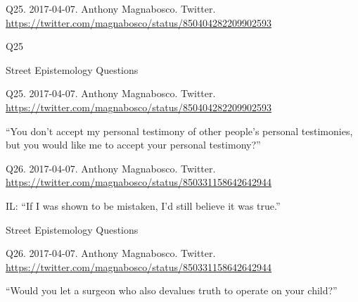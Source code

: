 \documentclass[
    src/templates/5x2-on-a4paper,
    frame
]{flashcards}
\newcommand{\myheader}{}
\newcommand{\myfooter}{
    \begin{flushright}
        \small\sc
        Street Epistemology Questions \par
    \end{flushright}
}
\begin{document}
        \renewcommand{\myheader}{
            \normalfont %
            \begin{tiny}
                Q25.
                2017-04-07.
                Anthony Magnabosco.
                    Twitter.
                    \\
                    \url{ https://twitter.com/magnabosco/status/850404282209902593 }
                \par
            \end{tiny}
        }
        \begin{flashcard}{
            \myheader
            \vspace{\fill}
            \begin{center}
                \large
                    Q25
            \end{center}
            \vspace{\fill}
            \myfooter
            \vspace{-1.4ex}
        }
            \myheader
            \vspace{\fill}
            \begin{center}
                \large
\enquote{You don't accept my personal testimony of other people's personal testimonies, but you would like me to accept your personal testimony?}            \end{center}
            \vspace{\fill}
        \end{flashcard}
        \renewcommand{\myheader}{
            \normalfont %
            \begin{tiny}
                Q26.
                2017-04-07.
                Anthony Magnabosco.
                    Twitter.
                    \\
                    \url{ https://twitter.com/magnabosco/status/850331158642642944 }
                \par
            \end{tiny}
        }
        \begin{flashcard}{
            \myheader
            \vspace{\fill}
            \begin{center}
                \large
                    IL: \enquote{If I was shown to be mistaken, I'd still believe it was true.}            \end{center}
            \vspace{\fill}
            \myfooter
            \vspace{-1.4ex}
        }
            \myheader
            \vspace{\fill}
            \begin{center}
                \large
\enquote{Would you let a surgeon who also devalues truth to operate on your child?}            \end{center}
            \vspace{\fill}
        \end{flashcard}
\end{document}
